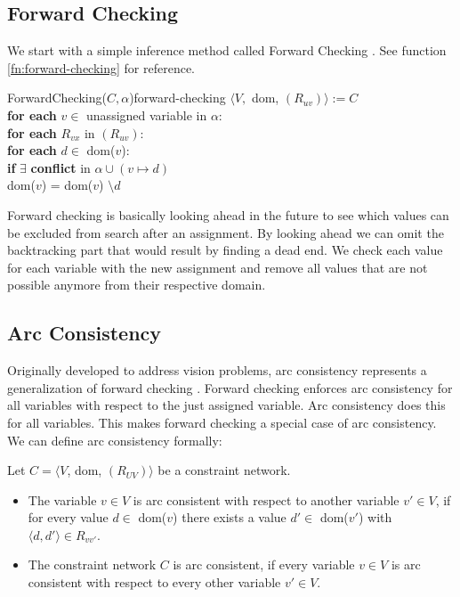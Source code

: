 \subsection{Forward Checking}

We start with a simple inference method called Forward Checking \cite{forward_checking:1980}. See function \ref{fn:forward-checking} for reference. \\

\begin{function}{ForwardChecking($C, \alpha$)}{forward-checking}
	$\langle V,$ dom, $(R_{uv})\rangle := C$ \\
	\textbf{for each} $v \in $ unassigned variable in $\alpha$: \\
	\null \qquad \textbf{for each} $R_{vx}$ in $(R_{uv})$: \\
	\null \qquad \qquad \textbf{for each} $d \in$ dom($v$): \\
	\null \qquad \qquad \qquad \textbf{if} $\exists$ \textbf{conflict} in $\alpha \cup (v \mapsto d)$ \\
	\null \qquad \qquad \qquad \qquad dom($v$) = dom($v$) $\setminus d$
\end{function}

Forward checking is basically looking ahead in the future to see which values can be excluded from search after an assignment. By looking ahead we can omit the backtracking part that would result by finding a dead end. We check each value for each variable with the new assignment and remove all values that are not possible anymore from their respective domain.

\subsection{Arc Consistency}

Originally developed to address vision problems, arc consistency represents a generalization of forward checking \cite{original_arc:1988}. Forward checking enforces arc consistency for all variables with respect to the just assigned variable. Arc consistency does this for all variables. This makes forward checking a special case of arc consistency. We can define arc consistency formally:

\begin{tcolorbox}
	Let $C = \langle V$, dom, $(R_{UV})\rangle$ be a constraint network.
	\begin{itemize}
		\item The variable $v \in V$ is arc consistent with respect to another variable $v'\in V$, if for every value $d \in$ dom($v$) there exists a value $d' \in$ dom($v'$) with $\langle d, d' \rangle \in R_{vv'}$.
		\item The constraint network $C$ is arc consistent, if every variable $v \in V$ is arc consistent with respect to every other variable $v' \in V$.
	\end{itemize}
\end{tcolorbox}


